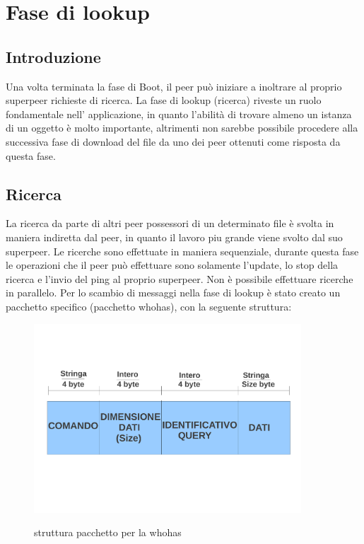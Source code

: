 \section{Fase di lookup}
\subsection{Introduzione}
Una volta terminata la fase di Boot, il peer può iniziare a inoltrare al proprio superpeer richieste di ricerca. La fase di lookup (ricerca) riveste un ruolo fondamentale nell' applicazione, in quanto l'abilità di trovare almeno un istanza di un oggetto è molto importante, altrimenti non sarebbe possibile procedere alla successiva fase di download del file da uno dei peer ottenuti come risposta da questa fase.\linebreak

\subsection{Ricerca}
La ricerca da parte di altri peer possessori di un determinato file è svolta in maniera indiretta dal peer, in quanto il lavoro piu grande viene svolto dal suo superpeer. \linebreak
Le ricerche sono effettuate in maniera sequenziale, durante questa fase le operazioni che il peer può effettuare sono solamente l'update, lo stop della ricerca e l'invio del ping al proprio superpeer. Non è possibile effettuare ricerche in parallelo.\linebreak
Per lo scambio di messaggi nella fase di lookup è stato creato un pacchetto specifico (pacchetto whohas), con la seguente struttura:\linebreak

\begin{figure}[h]
\centering
{\includegraphics[width=10cm]{img/pck_whhs}}
\caption{struttura pacchetto per la whohas}
\end{figure}

